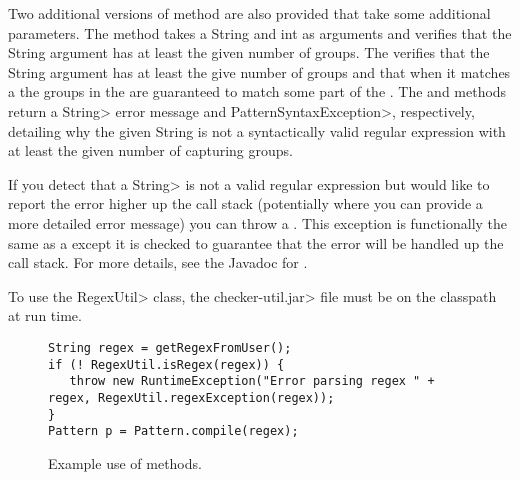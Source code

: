 Two additional versions of  method are also provided that take some additional
parameters. The 
method takes a String and int as arguments and
verifies that the String argument has at least the given number of groups. The
verifies that the String argument has at least the give number of groups and that when it
matches a  the groups in the  are guaranteed to match some
part of the . The
 and
methods return a \<String> error message and \<Pattern\-Syntax\-Exception>,
respectively, detailing why the given String is not a syntactically valid
regular expression with at least the given number of capturing groups.

\begin{sloppypar}
If you detect that a \<String> is not a valid regular expression but would like
to report the error higher up the call stack (potentially where you can
provide a more detailed error message) you can throw a
. This exception is
functionally the same as a
except it is checked to guarantee that the error will be handled up the
call stack.  For more details, see the Javadoc for
.
\end{sloppypar}

To use the \<RegexUtil> class, the \<checker-util.jar> file
must be on the classpath at run time.

\begin{figure}
\begin{smaller}
\begin{Verbatim}
String regex = getRegexFromUser();
if (! RegexUtil.isRegex(regex)) {
   throw new RuntimeException("Error parsing regex " + regex, RegexUtil.regexException(regex));
}
Pattern p = Pattern.compile(regex);
\end{Verbatim}
\end{smaller}
\caption{Example use of  methods.}
\label{fig-regex-util-example}
\end{figure}

